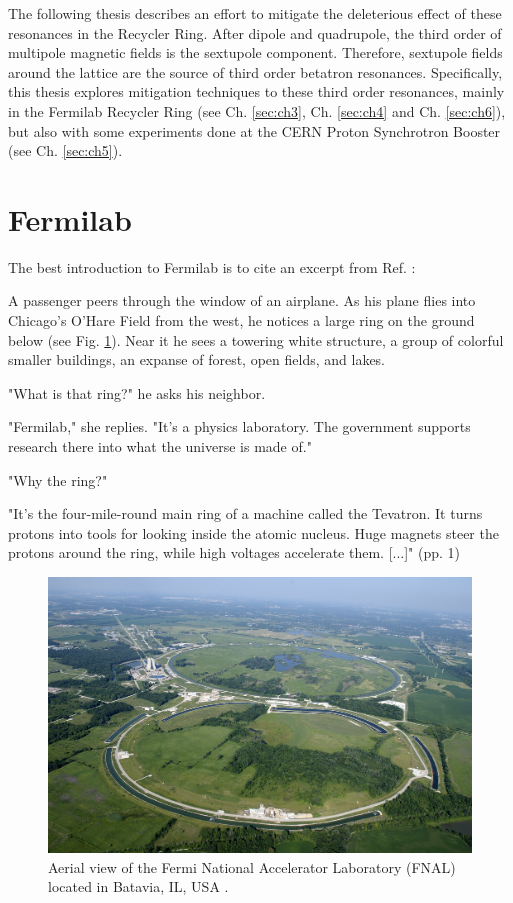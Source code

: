 The following thesis describes an effort to mitigate the deleterious effect of these resonances in the Recycler Ring. After dipole and quadrupole, the third order of multipole magnetic fields is the sextupole component. Therefore, sextupole fields around the lattice are the source of third order betatron resonances. Specifically, this thesis explores mitigation techniques to these third order resonances, mainly in the Fermilab Recycler Ring (see Ch. \ref{sec:ch3}, Ch. \ref{sec:ch4} and Ch. \ref{sec:ch6}), but also with some experiments done at the CERN Proton Synchrotron Booster (see Ch. \ref{sec:ch5}). 

\section{Fermilab}

The best introduction to Fermilab is to cite an excerpt from Ref. \cite{fermilab1}:
\begin{displayquote}
    \begin{flushleft}
    [...] A passenger peers through the window of an airplane. As his plane flies into Chicago's O'Hare Field from the west, he notices a large ring on the ground below (see Fig. \ref{fig:fermia}). Near it he sees a towering white structure, a group of colorful smaller buildings, an expanse of forest, open fields, and lakes.

    "What is that ring?" he asks his neighbor.

    "Fermilab," she replies. "It's a physics laboratory. The government supports research there into what the universe is made of."

    "Why the ring?"

    "It's the four-mile-round main ring of a machine called the Tevatron. It turns protons into tools for looking inside the atomic nucleus. Huge magnets steer the protons around the ring, while high voltages accelerate them. [...]" (pp. 1)
    \end{flushleft}
\end{displayquote}

\begin{figure}[H]
    \centering
    \includegraphics[width=\columnwidth]{chapter1/fermilab.jpeg}
    \caption{Aerial view of the Fermi National Accelerator Laboratory (FNAL) located in Batavia, IL, USA \cite{fermipic}.}
    \label{fig:fermia}
 \end{figure}

